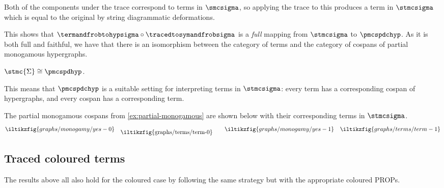 \begin{example}
\begin{center}
{
        }\)
    \end{center}
    Both of the components under the trace correspond to terms in \(\smcsigma\),
    so applying the trace to this produces a term in \(\stmcsigma\) which is
    equal to the original by string diagrammatic deformations.
    \begin{center}
    \end{center}
\end{example}

This shows that \(
\termandfrobtohypsigma \circ \tracedtosymandfrobsigma
\) is a \emph{full} mapping from \(\stmcsigma\) to \(\pmcspdchyp\).
As it is both full and faithful, we have that there is an isomorphism
between the category of terms and the category of cospans of partial
monogamous hypergraphs.

\begin{corollary}\label{cor:stmc-graph-iso}
    \(\stmc{\Sigma} \cong \pmcspdhyp\).
\end{corollary}

This means that \(\pmcspdchyp\) is a suitable setting for interpreting terms in
\(\stmcsigma\): every term has a corresponding cospan of hypergraphs, and
every cospan has a corresponding term.

\begin{example}
    The partial monogamous cospans from \cref{ex:partial-monogamous} are shown
    below with their corresponding terms in \(\stmcsigma\).
    \[
        \iltikzfig{graphs/monogamy/yes-0}
        \quad
        \raisebox{-0.5em}{\iltikzfig{graphs/terms/term-0}}
        \qquad
        \iltikzfig{graphs/monogamy/yes-1}
        \quad
        \iltikzfig{graphs/terms/term-1}
    \]
\end{example}

\subsection{Traced coloured terms}

The results above all also hold for the coloured case by following the same
strategy but with the appropriate coloured PROPs.


